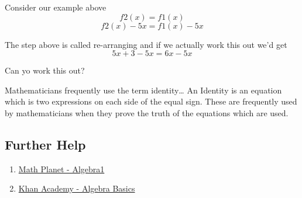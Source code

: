 \documentclass[11pt]{article}
\providecommand{\tightlist}{%
      \setlength{\itemsep}{0pt}\setlength{\parskip}{0pt}}
\begin{document}
Consider our example above
$$ f2(x)=f1(x) $$
$$ f2(x)-5x = f1(x) -5x$$

The step above is called re-arranging and if we actually work this out we'd get
$$ 5x+3 -5x = 6x - 5x$$

Can yo work this out?


    Mathematicians frequently use the term identity\ldots{} An Identity is
an equation which is two expressions on each side of the equal sign.
These are frequently used by mathematicians when they prove the truth of
the equations which are used.

    \hypertarget{further-help}{%
\subsection{Further Help}\label{further-help}}

\begin{enumerate}
\def\labelenumi{\arabic{enumi}.}
\tightlist
\item
  \href{https://www.mathplanet.com/education/algebra-1}{Math Planet -
  Algebra1}
\item
  \href{https://www.khanacademy.org/math/algebra-basics}{Khan Academy -
  Algebra Basics}
\end{enumerate}


    
    
    
    
\end{document}
